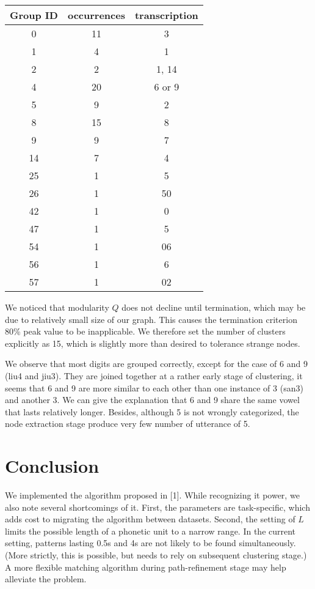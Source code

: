 \documentclass{article}
\begin{document}
    \begin{tabular}{ccc}
    \hline
        Group ID &     occurrences   & transcription\\
    \hline
        0   &      11 &3\\
        1   &       4&1\\
        2   &       2&1, 14\\
        4   &       20&6 or 9\\
        5   &       9&2\\
        8   &       15&8\\
        9   &       9&7\\
        14  &       7&4\\
        25  &       1&5\\
        26  &       1&50\\
        42  &       1&0\\
        47  &       1&5\\
        54  &       1&06\\
        56  &       1&6\\
        57  &       1&02\\
    \hline
    \end{tabular}

    We noticed that modularity $Q$ does not decline until termination, which may be due to relatively small size
    of our graph. This causes the termination criterion 80\% peak value to be inapplicable. We therefore set 
    the number of clusters explicitly as 15, which is slightly more than desired to tolerance strange nodes. 
    
    We observe that most digits are grouped correctly, except 
    for the case of 6 and 9 (liu4 and jiu3). They are joined together at a rather early stage of clustering, 
    it seems that 6 and 9 are more similar to each other than one instance of 3 (san3) and another 3. We can 
    give the explanation that 6 and 9 share the same vowel that lasts relatively longer. Besides, although 5 is 
    not wrongly categorized, the node extraction stage produce very few number of utterance of 5.

\section{Conclusion}
    We implemented the algorithm proposed in [1]. While recognizing it power, we also note several 
    shortcomings of it. First, the parameters are task-specific, which adds cost to migrating the algorithm 
    between datasets. Second, the setting of $L$ limits the possible length of a phonetic unit to 
    a narrow range. In the current setting, patterns lasting 0.5s and 4s are not likely to be found simultaneously.
    (More strictly, this is possible, but needs to rely on subsequent clustering stage.) A more flexible 
    matching algorithm during path-refinement stage may help alleviate the problem.
\end{document}
